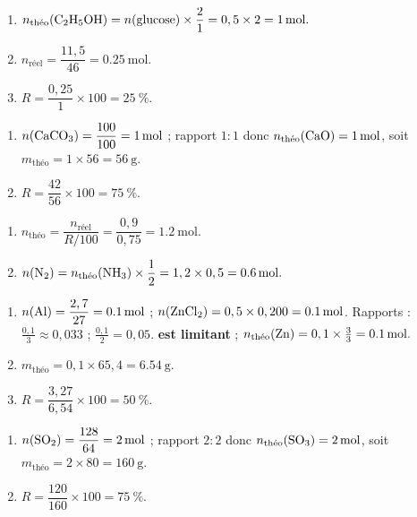 \documentclass[11pt,a4paper]{article}
\begin{document}
\begin{corrige}
\begin{enumerate}[label=\alph*)]
  \item $n_{\text{théo}}(\ce{C2H5OH})=n(\ce{glucose})\times\dfrac{2}{1}=0,5\times2=\qty{1}{\mole}.$
  \item $n_{\text{réel}}=\dfrac{11,5}{46}=\qty{0.25}{\mole}.$
  \item $R=\dfrac{0,25}{1}\times100=\qty{25}{\percent}.$
\end{enumerate}
\end{corrige}

\begin{corrige}
\begin{enumerate}[label=\alph*)]
  \item $n(\ce{CaCO3})=\dfrac{100}{100}=\qty{1}{\mole}$ ; rapport $1:1$ donc
        $n_{\text{théo}}(\ce{CaO})=\qty{1}{\mole}$, soit $m_{\text{théo}}=1\times56=\qty{56}{\gram}.$
  \item $R=\dfrac{42}{56}\times100=\qty{75}{\percent}.$
\end{enumerate}
\end{corrige}

\begin{corrige}
\begin{enumerate}[label=\alph*)]
  \item $n_{\text{théo}}=\dfrac{n_{\text{réel}}}{R/100}=\dfrac{0,9}{0,75}=\qty{1.2}{\mole}.$
  \item $n(\ce{N2})=n_{\text{théo}}(\ce{NH3})\times\dfrac{1}{2}=1,2\times0,5=\qty{0.6}{\mole}.$
\end{enumerate}
\end{corrige}

\begin{corrige}
\begin{enumerate}[label=\alph*)]
  \item $n(\ce{Al})=\dfrac{2,7}{27}=\qty{0.1}{\mole}$ ; $n(\ce{ZnCl2})=0,5\times0,200=\qty{0.1}{\mole}$.
        Rapports :  $\frac{0,1}{3}\approx0,033$ ;  $\frac{0,1}{2}=0,05$.
        \textbf{ est limitant} ; $n_{\text{théo}}(\ce{Zn})=0,1\times\frac{3}{3}=\qty{0.1}{\mole}.$
  \item $m_{\text{théo}}=0,1\times65,4=\qty{6.54}{\gram}.$
  \item $R=\dfrac{3,27}{6,54}\times100=\qty{50}{\percent}.$
\end{enumerate}
\end{corrige}

\begin{corrige}
\begin{enumerate}[label=\alph*)]
  \item $n(\ce{SO2})=\dfrac{128}{64}=\qty{2}{\mole}$ ; rapport $2:2$ donc
        $n_{\text{théo}}(\ce{SO3})=\qty{2}{\mole}$, soit $m_{\text{théo}}=2\times80=\qty{160}{\gram}.$
  \item $R=\dfrac{120}{160}\times100=\qty{75}{\percent}.$
\end{enumerate}
\end{corrige}
\end{document}
